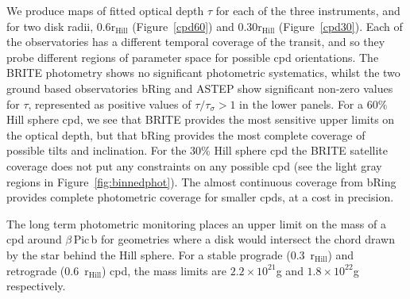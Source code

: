 \documentclass[longauth]{aa} %
\newcommand{\rhill}{$\mathrm{r_{Hill}}$} %
\newcommand{\bpb}{$\beta$\,Pic\,b}
\begin{document}
We produce maps of fitted optical depth $\tau$ for each of the three instruments, and for two disk radii, 0.6\rhill{} (Figure~\ref{cpd60}) and 0.30\rhill{} (Figure~\ref{cpd30}).
%
Each of the observatories has a different temporal coverage of the transit, and so they probe different regions of parameter space for possible \ac{cpd} orientations.
%
The BRITE photometry shows no significant photometric systematics, whilst the two ground based observatories bRing and ASTEP show significant non-zero values for $\tau$, represented as positive values of $\tau / \tau_\sigma > 1$ in the lower panels.
%
For a 60\% Hill sphere \ac{cpd}, we see that BRITE provides the most sensitive upper limits on the optical depth, but that bRing provides the most complete coverage of possible tilts and inclination.
%
For the 30\% Hill sphere \ac{cpd} the BRITE satellite coverage does not put any constraints on any possible \ac{cpd} (see the light gray regions in Figure~\ref{fig:binnedphot}).
%
The almost continuous coverage from bRing provides complete photometric coverage for smaller \ac{cpd}s, at a cost in precision.

The long term photometric monitoring places an upper limit on the mass of a \ac{cpd} around \bpb{} for geometries where a disk would intersect the chord drawn by the star behind the Hill sphere.
%
For a stable prograde (0.3\ \rhill{}) and retrograde (0.6\ \rhill{}) \ac{cpd}, the mass limits are $2.2\times 10^{21}$g and $1.8\times 10^{22}$g respectively.
%
\end{document}
